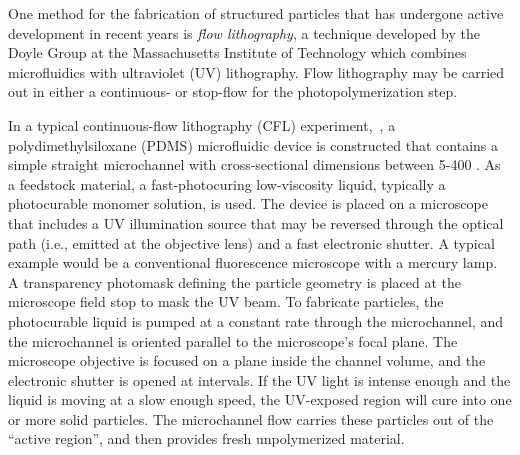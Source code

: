 One method for the fabrication of structured particles that has undergone active development in recent years is 
\textit{flow lithography}, a technique developed by the Doyle Group at 
the Massachusetts Institute of Technology which combines microfluidics with 
ultraviolet (UV) lithography.  Flow lithography may be carried out in either a continuous- or stop-flow 
for the photopolymerization step.


In a typical continuous-flow lithography (CFL) experiment,~\cite{dendukuri-cfl},
a polydimethylsiloxane (PDMS) microfluidic device is constructed
that contains a simple straight microchannel with cross-sectional dimensions between 5-400 \microns. As a feedstock
material, a fast-photocuring low-viscosity liquid, typically a photocurable monomer solution,
is used. The device is 
placed on a microscope that includes a UV illumination source that may be reversed through the optical path (i.e.,
emitted at the objective lens) and a fast electronic shutter. A typical example would be a conventional 
fluorescence microscope with a mercury lamp.  A
transparency photomask defining the particle geometry is placed at the microscope
field stop to mask the UV beam.
To fabricate particles, the photocurable liquid is pumped 
at a constant rate through the microchannel, and the microchannel is oriented
parallel to the microscope's focal plane. The microscope objective is focused on a plane inside the channel
volume, and the
electronic shutter is opened at intervals. If the UV light is intense enough and the liquid is moving at a slow enough speed,
the UV-exposed region will cure into one or more solid particles.  
The microchannel flow carries these particles out of the ``active 
region'', and then provides fresh unpolymerized material.



